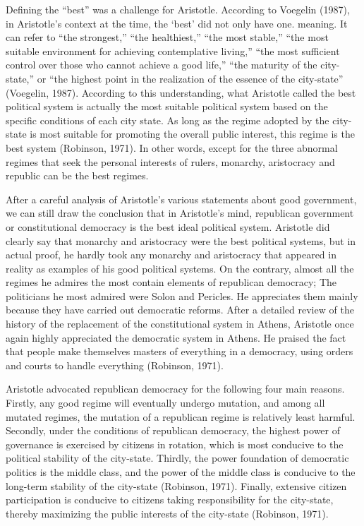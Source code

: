 \documentclass[11pt]{article}
\begin{document}
Defining the “best” was a challenge for Aristotle. According to Voegelin (1987), in Aristotle's context at the time, the ‘best' did not only have one. meaning. It can refer to “the strongest,” “the healthiest,” “the most stable,” “the most suitable environment for achieving contemplative living,” “the most sufficient control over those who cannot achieve a good life,” “the maturity of the city-state,” or “the highest point in the realization of the essence of the city-state” (Voegelin, 1987). According to this understanding, what Aristotle called the best political system is actually the most suitable political system based on the specific conditions of each city state. As long as the regime adopted by the city-state is most suitable for promoting the overall public interest, this regime is the best system (Robinson, 1971). In other words, except for the three abnormal regimes that seek the personal interests of rulers, monarchy, aristocracy and republic can be the best regimes.

After a careful analysis of Aristotle's various statements about good government, we can still draw the conclusion that in Aristotle's mind, republican government or constitutional democracy is the best ideal political system. Aristotle did clearly say that monarchy and aristocracy were the best political systems, but in actual proof, he hardly took any monarchy and aristocracy that appeared in reality as examples of his good political systems. On the contrary, almost all the regimes he admires the most contain elements of republican democracy; The politicians he most admired were Solon and Pericles. He appreciates them mainly because they have carried out democratic reforms. After a detailed review of the history of the replacement of the constitutional system in Athens, Aristotle once again highly appreciated the democratic system in Athens. He praised the fact that people make themselves masters of everything in a democracy, using orders and courts to handle everything (Robinson, 1971).

Aristotle advocated republican democracy for the following four main reasons. Firstly, any good regime will eventually undergo mutation, and among all mutated regimes, the mutation of a republican regime is relatively least harmful. Secondly, under the conditions of republican democracy, the highest power of governance is exercised by citizens in rotation, which is most conducive to the political stability of the city-state. Thirdly, the power foundation of democratic politics is the middle class, and the power of the middle class is conducive to the long-term stability of the city-state (Robinson, 1971). Finally, extensive citizen participation is conducive to citizens taking responsibility for the city-state, thereby maximizing the public interests of the city-state (Robinson, 1971).
\end{document}
